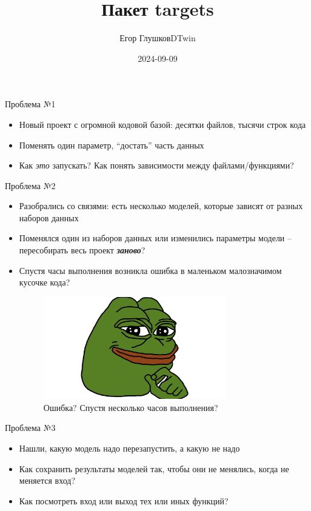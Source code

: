 \documentclass[
  ignorenonframetext,
]{beamer}
\title{Пакет targets}
\author{Егор ГлушковDTwin}
\date{2024-09-09}
\begin{document}
\frame{\titlepage}

\begin{frame}{Проблема №1}
\label{ux43fux440ux43eux431ux43bux435ux43cux430-1}
\begin{itemize}
\item
  Новый проект с огромной кодовой базой: десятки файлов, тысячи строк
  кода
\item
  Поменять один параметр, ``достать'' часть данных
\item
  Как \emph{это} запускать? Как понять зависимости между
  файлами/функциями?
\end{itemize}
\end{frame}

\begin{frame}{Проблема №2}
\label{ux43fux440ux43eux431ux43bux435ux43cux430-2}
\begin{itemize}
\item
  Разобрались со связями: есть несколько моделей, которые зависят от
  разных наборов данных
\item
  Поменялся один из наборов данных или изменились параметры модели --
  пересобирать весь проект \textbf{\emph{заново}}?
\end{itemize}

\begin{itemize}[<+->]
\item
  Спустя часы выполнения возникла ошибка в маленьком малозначимом
  кусочке кода?

  \begin{figure}[H]

  {\centering \includegraphics[width=3.125in,height=\textheight]{Sources/pepe.jpg}

  }

  \caption{Ошибка? Спустя несколько часов выполнения?}

  \end{figure}%
\end{itemize}
\end{frame}

\begin{frame}{Проблема №3}
\label{ux43fux440ux43eux431ux43bux435ux43cux430-3}
\begin{itemize}
\item
  Нашли, какую модель надо перезапустить, а какую не надо
\item
  Как сохранить результаты моделей так, чтобы они не менялись, когда не
  меняется вход?
\item
  Как посмотреть вход или выход тех или иных функций?
\end{itemize}
\end{frame}
\end{document}
